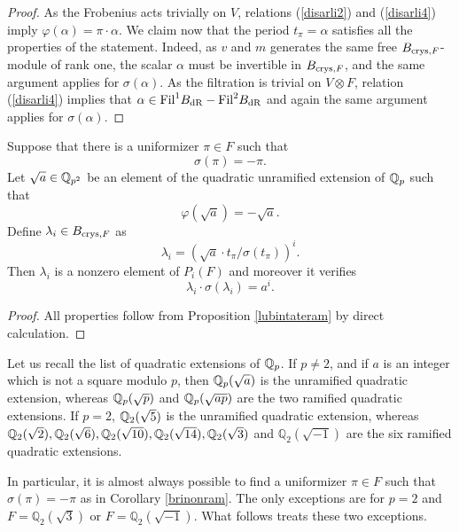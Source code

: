 \begin{proof}
As the Frobenius acts trivially on $V$, relations (\ref{disarli2}) and (\ref{disarli4}) imply $ \varphi(\alpha) = \pi  \cdot \alpha$. We claim now that the period $t_\pi=\alpha$ satisfies all the properties of the statement. Indeed, as $v$ and $m$ generates the same free  $B_{\textnormal{crys},F}$-module of rank one, the scalar $\alpha$ must be invertible in $B_{\textnormal{crys},F}$, and the same argument applies for $ \sigma(\alpha)$. As the filtration is trivial on $V \otimes F$, relation   (\ref{disarli4}) implies that $\alpha \in \textnormal{Fil} ^{1} B_{\mathrm{dR}}-\textnormal{Fil} ^{2} B_{\mathrm{dR}}$ and again the same argument applies for $ \sigma(\alpha)$.
 \end{proof}
\begin{corollary}
\notready\label{brinonram}
Suppose that there is a uniformizer $\pi\in F$ such that
\[\sigma(\pi)=-\pi.\]
Let $\sqrt{a}\in \mathbb{Q}_{p^2}$ be an element of the quadratic unramified extension of $\mathbb{Q}_p$ such that
\[\varphi(\sqrt{a}) = -\sqrt{a}.\]
Define $\lambda_i \in B_{\textnormal{crys},F}$ as
\[\lambda_i = (\sqrt{a}  \cdot t_\pi/ \sigma(t_\pi))^i .\]
Then $\lambda_i$ is a nonzero element of  $P_i(F)$ and moreover it verifies
\[\lambda_i \cdot\sigma(\lambda_i) = a^i.\]
\end{corollary}
\begin{proof}
All properties follow from  Proposition \ref{lubintateram} by direct calculation.
\end{proof}

\begin{remark}
\notready\label{remtame}
Let us recall the list of quadratic extensions of $\mathbb{Q}_p$. If $p\neq 2$, and if $a$ is an integer which is not a square modulo $p$, then $\mathbb{Q}_p(\sqrt{a})$ is the unramified quadratic extension, whereas $\mathbb{Q}_p(\sqrt{p})$ and $\mathbb{Q}_p(\sqrt{ap})$ are the two ramified quadratic extensions.
If $p=2$,  $\mathbb{Q}_2(\sqrt{5})$ is the unramified quadratic extension, whereas $\mathbb{Q}_2(\sqrt{2}),\mathbb{Q}_2(\sqrt{6}),\mathbb{Q}_2(\sqrt{10}),\mathbb{Q}_2(\sqrt{14}),\mathbb{Q}_2(\sqrt{3})$ and $\mathbb{Q}_2(\sqrt{-1})$ are the six ramified quadratic extensions.

In particular, it is almost always possible to find a uniformizer $\pi\in F$ such that
$\sigma(\pi)=-\pi$ as in  Corollary \ref{brinonram}. The only exceptions are for  $p=2$ and  $F=\mathbb{Q}_2(\sqrt{3})$ or  $F=\mathbb{Q}_2(\sqrt{-1})$.  What follows treats these two exceptions.
\end{remark}




